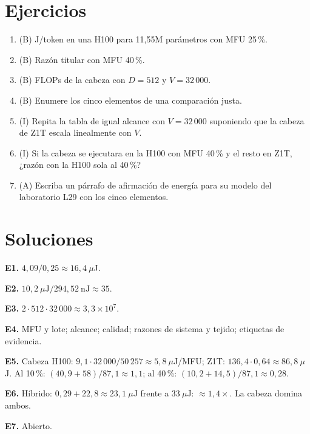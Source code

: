 \documentclass[11pt,a4paper]{article}
\begin{document}
\section{Ejercicios}
\begin{enumerate}[label=\textbf{E\arabic*.}]
\item (B) J/token en una H100 para 11{,}55M parámetros con MFU 25\,\%.
\item (B) Razón titular con MFU 40\,\%.
\item (B) FLOPs de la cabeza con $D=512$ y $V=32\,000$.
\item (B) Enumere los cinco elementos de una comparación justa.
\item (I) Repita la tabla de igual alcance con $V=32\,000$ suponiendo que la cabeza de Z1T escala linealmente con $V$.
\item (I) Si la cabeza se ejecutara en la H100 con MFU 40\,\% y el resto en Z1T, ¿razón con la H100 sola al 40\,\%?
\item (A) Escriba un párrafo de afirmación de energía para su modelo del laboratorio L29 con los cinco elementos.
\end{enumerate}
\section{Soluciones}
\begin{solucion}
\textbf{E1.} $4{,}09/0{,}25\approx16{,}4\ \mu$J.

\textbf{E2.} $10{,}2\ \mu\text{J}/294{,}52\ \text{nJ}\approx35$.

\textbf{E3.} $2\cdot512\cdot32\,000\approx3{,}3\times10^7$.

\textbf{E4.} MFU y lote; alcance; calidad; razones de sistema y tejido; etiquetas de evidencia.

\textbf{E5.} Cabeza H100: $9{,}1\cdot32\,000/50\,257\approx5{,}8\ \mu$J/MFU; Z1T: $136{,}4\cdot0{,}64\approx86{,}8\ \mu$J. Al 10\,\%: $(40{,}9+58)/87{,}1\approx1{,}1$;
al 40\,\%: $(10{,}2+14{,}5)/87{,}1\approx0{,}28$.

\textbf{E6.} Híbrido: $0{,}29+22{,}8\approx23{,}1\ \mu$J frente a $33\ \mu$J: $\approx1{,}4\times$. La cabeza domina ambos.

\textbf{E7.} Abierto.
\end{solucion}
\end{document}

